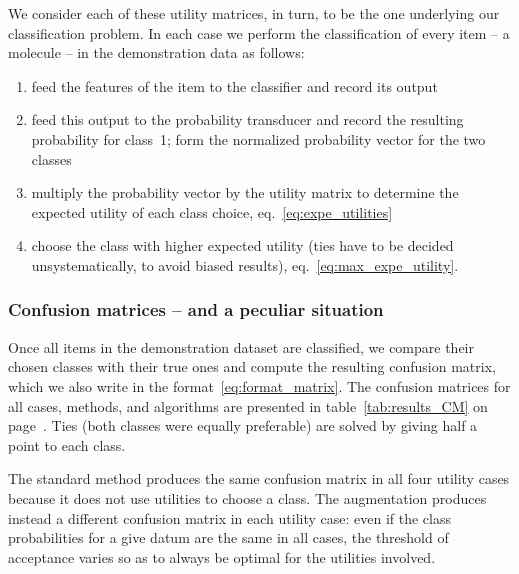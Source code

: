 \documentclass[\ifafour a4paper,12pt,\else a5paper,10pt,\fi%
onecolumn,oneside,article,%
british%
]{memoir}
\theoremstyle{remark}
\theoremstyle{innote}
\renewcommand*{\|}[1][]{\nonscript\:#1\vert\nonscript\:\mathopen{}}
\newcommand*{\sect}{\S}%
\newcommand*{\eqn}{eq.}%
\begin{document}
We consider each of these utility matrices, in turn, to be the one underlying our classification problem. In each case we perform the classification of every item -- a molecule -- in the demonstration data as follows:
\begin{enumerate}[label=\arabic*.]
\item feed the features of the item to the classifier and record its output
\item feed this output to the probability transducer and record the resulting probability for class~1; form the normalized probability vector for the two classes 
\item multiply the probability vector by the utility matrix to determine the expected utility of each class choice, \eqn~\eqref{eq:expe_utilities}
\item choose the class with higher expected utility (ties have to be decided unsystematically, to avoid biased results), \eqn~\eqref{eq:max_expe_utility}.
\end{enumerate}


\subsubsection{Confusion matrices -- and a peculiar situation}

Once all items in the demonstration dataset are classified, we compare their chosen classes with their true ones and compute the resulting confusion matrix, which we also write in the format~\eqref{eq:format_matrix}. The confusion matrices for all cases, methods, and algorithms are presented in table~\ref{tab:results_CM} on page~\pageref{tab:results_CM}. Ties (both classes were equally preferable) are solved by giving half a point to each class.

The standard method produces the same confusion matrix in all four utility cases because it does not use utilities to choose a class. The augmentation produces instead a different confusion matrix in each utility case: even if the class probabilities for a give datum are the same in all cases, the threshold of acceptance varies so as to always be optimal for the utilities involved.
\end{document}
